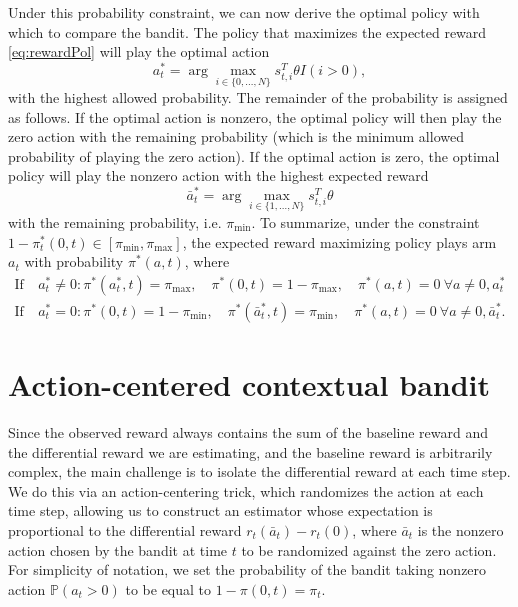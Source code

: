 \documentclass{article}
\begin{document}

Under this probability constraint, we can now derive the optimal policy with which to compare the bandit. The policy that maximizes the expected reward \eqref{eq:rewardPol} will play the optimal action 
\[
a^*_t = \arg \max_{i \in \{0,\dots, N\}} s_{t,i}^T \theta I(i > 0),
\]
with the highest allowed probability. The remainder of the probability is assigned as follows. If the optimal action is nonzero, the optimal policy will then play the zero action with the remaining probability (which is the minimum allowed probability of playing the zero action). If the optimal action is zero, the optimal policy will play the nonzero action with the highest expected reward 
\[
\bar{a}^{*}_t = \arg \max_{i \in \{1,\dots, N\}} s_{t,i}^T \theta
\]
with the remaining probability, i.e. $\pi_{\min}$.
To summarize, under the constraint $1-\pi^*_t(0,t) \in [\pi_{\min},\pi_{\max}]$, the expected reward maximizing policy plays arm $a_t$ with probability $\pi^*(a,t)$, where
\begin{align}\label{eq:policy}
\mathrm{If} \: &a^*_t \neq 0: \pi^*(a^*_t,t) = \pi_{\max},\quad \pi^*(0,t) = 1-\pi_{\max}, \quad \pi^*(a,t) = 0 \:\forall a \neq 0, a^*_t\\\nonumber
\mathrm{If} \: &a^*_t = 0: \pi^*(0,t) = 1-\pi_{\min},\quad \pi^*(\bar{a}^{*}_t,t) = \pi_{\min}, \quad \pi^*(a,t)  = 0 \: \forall a \neq 0, \bar{a}^*_t.
\end{align}






\section{Action-centered contextual bandit}
Since the observed reward always contains the sum of the baseline reward and the differential reward we are estimating, and the baseline reward is arbitrarily complex, the main challenge is to isolate the differential reward at each time step. We do this via an action-centering trick, which randomizes the action at each time step, allowing us to construct an estimator whose expectation is proportional to the differential reward $r_t(\bar{a}_t) - r_t(0)$, where $\bar{a}_t$ is the nonzero action chosen by the bandit at time $t$ to be randomized against the zero action. For simplicity of notation, we set the probability of the bandit taking nonzero action $\mathbb{P}(a_t > 0)$ to be equal to $1- \pi(0,t) = \pi_t$.
\end{document}
